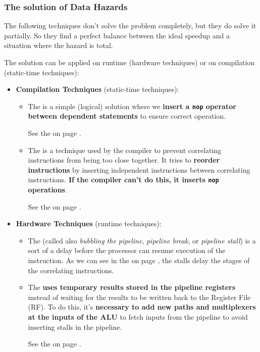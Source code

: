 \subsubsection{The solution of Data Hazards}

The following techniques don't solve the problem completely, but they do solve it partially. So they find a perfect balance between the ideal speedup and a situation where the hazard is total.

\highspace
The solution can be applied on runtime (hardware techniques) or on compilation (static-time techniques):
\begin{itemize}
    \item \textbf{Compilation Techniques} (static-time techniques):
    \begin{itemize}
        \item The  is a simple (logical) solution where we \textbf{insert a \texttt{nop} operator between dependent statements} to ensure correct operation.

        See the  on page \pageref{example: insertion of nop}.


        \item The  is a technique used by the compiler to prevent correlating instructions from being too close together. It tries to \textbf{reorder instructions} by inserting independent instructions between correlating instructions. \textbf{If the compiler can't do this, it inserts \texttt{nop} operations}.

        See the  on page \pageref{example: instructions scheduling}.
    \end{itemize}

    \item \textbf{Hardware Techniques} (runtime techniques):
    \begin{itemize}
        \item The  (called also \emph{bubbling the pipeline}, \emph{pipeline break}, or \emph{pipeline stall}) is a sort of a delay before the processor can resume execution of the instruction. As we can see in the  on page \pageref{example: insertion of stalls}, the stalls delay the stages of the correlating instructions.

        \item The  \textbf{uses temporary results stored in the pipeline registers} instead of waiting for the results to be written back to the Register File (RF). To do this, it's \textbf{necessary to add new paths and multiplexers at the inputs of the ALU} to fetch inputs from the pipeline to avoid inserting stalls in the pipeline.

        See the  on page \pageref{example: data forwarding}.
    \end{itemize}
\end{itemize}
